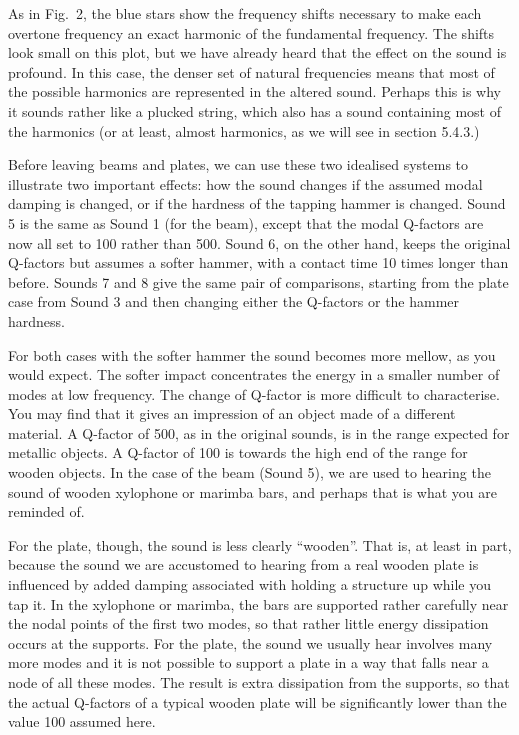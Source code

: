   As in Fig.\ 2, the blue stars show the frequency shifts necessary to make 
  each overtone frequency an exact harmonic of the fundamental frequency. The 
  shifts look small on this plot, but we have already heard that the effect on 
  the sound is profound. In this case, the denser set of natural frequencies 
  means that most of the possible harmonics are represented in the altered 
  sound. Perhaps this is why it sounds rather like a plucked string, which also 
  has a sound containing most of the harmonics (or at least, almost harmonics, 
  as we will see in section 5.4.3.) 

  Before leaving beams and plates, we can use these two idealised systems to 
  illustrate two important effects: how the sound changes if the assumed modal 
  damping is changed, or if the hardness of the tapping hammer is changed. 
  Sound 5 is the same as Sound 1 (for the beam), except that the modal 
  Q-factors are now all set to 100 rather than 500. Sound 6, on the other hand, 
  keeps the original Q-factors but assumes a softer hammer, with a contact time 
  10 times longer than before. Sounds 7 and 8 give the same pair of 
  comparisons, starting from the plate case from Sound 3 and then changing 
  either the Q-factors or the hammer hardness. 

  For both cases with the softer hammer the sound becomes more mellow, as you 
  would expect. The softer impact concentrates the energy in a smaller number 
  of modes at low frequency. The change of Q-factor is more difficult to 
  characterise. You may find that it gives an impression of an object made of a 
  different material. A Q-factor of 500, as in the original sounds, is in the 
  range expected for metallic objects. A Q-factor of 100 is towards the high 
  end of the range for wooden objects. In the case of the beam (Sound 5), we 
  are used to hearing the sound of wooden xylophone or marimba bars, and 
  perhaps that is what you are reminded of. 

  For the plate, though, the sound is less clearly ``wooden''. That is, at 
  least in part, because the sound we are accustomed to hearing from a real 
  wooden plate is influenced by added damping associated with holding a 
  structure up while you tap it. In the xylophone or marimba, the bars are 
  supported rather carefully near the nodal points of the first two modes, so 
  that rather little energy dissipation occurs at the supports. For the plate, 
  the sound we usually hear involves many more modes and it is not possible to 
  support a plate in a way that falls near a node of all these modes. The 
  result is extra dissipation from the supports, so that the actual Q-factors 
  of a typical wooden plate will be significantly lower than the value 100 
  assumed here. 

